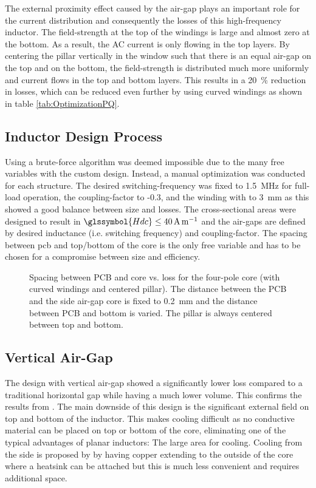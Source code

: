 \documentclass{IPEC2026}
\newcommand{\sbl}[1]{\glssymbol{#1}}
\newcommand{\ac}{\gls}
\begin{document}
The external proximity effect caused by the air-gap plays an important role for the current distribution and consequently the losses of this high-frequency inductor. The field-strength at the top of the windings is large and almost zero at the bottom. As a result, the AC current is only flowing in the top layers. By centering the pillar vertically in the window such that there is an equal air-gap on the top and on the bottom, the field-strength is distributed much more uniformly and current flows in the top and bottom layers. This results in a \qty{20}{\percent} reduction in losses, which can be reduced even further by using curved windings as shown in table \ref{tab:OptimizationPQ}.

\subsection{Inductor Design Process}
Using a brute-force algorithm was deemed impossible due to the many free variables with the custom design. Instead, a manual optimization was conducted for each structure. The desired switching-frequency was fixed to \qty{1.5}{\MHz} for full-load operation, the coupling-factor to -0.3, and the winding with to \qty{3}{\mm} as this showed a good balance between size and losses. The cross-sectional areas were designed to result in $\sbl{Hdc} \leq \qty{40}{\A\per\m}$ and the air-gaps are defined by desired inductance (i.e. switching frequency) and coupling-factor. The spacing between \ac{pcb} and top/bottom of the core is the only free variable and has to be chosen for a compromise between size and efficiency.

\begin{figure}
  \centering
  
  \caption{Spacing between PCB and core vs. loss for the four-pole core (with curved windings and centered pillar). The distance between the PCB and the side air-gap core is fixed to \qty{0.2}{\mm} and the distance between PCB and bottom is varied. The pillar is always centered between top and bottom.}
  \label{fig:fourPole_spacingVsLoss}
\end{figure}

\subsection{Vertical Air-Gap}
The design with vertical air-gap showed a significantly lower loss compared to a traditional horizontal gap while having a much lower volume. This confirms the results from \cite{schaferNovelHighlyEfficient2020}. The main downside of this design is the significant external field on top and bottom of the inductor. This makes cooling difficult as no conductive material can be placed on top or bottom of the core, eliminating one of the typical advantages of planar inductors: The large area for cooling. Cooling from the side is proposed by \cite{schaferNovelHighlyEfficient2020} by having copper extending to the outside of the core where a heatsink can be attached but this is much less convenient and requires additional space.
\end{document}
